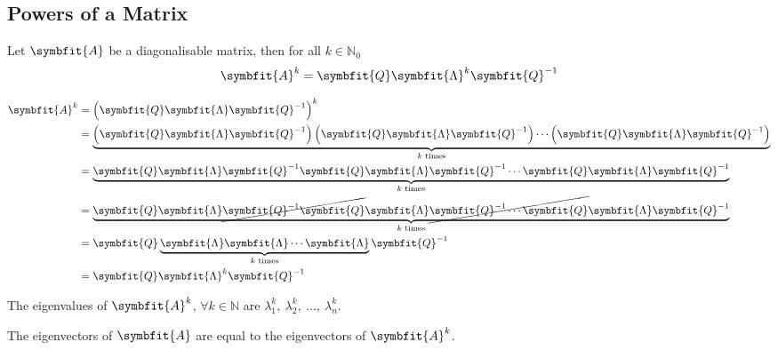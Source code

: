 \documentclass{article}
\begin{document}
\subsection{Powers of a Matrix}
\begin{theorem}
    Let \(\symbfit{A}\) be a diagonalisable matrix, then for all
    \(k \in \mathbb{N}_0\)
    \begin{equation*}
        \symbfit{A}^k = \symbfit{Q} \symbfit{\Lambda}^k \symbfit{Q}^{-1}
    \end{equation*}
\end{theorem}
\begin{solutionF}[Proof]
    \begin{align*}
        \symbfit{A}^k & = \left( \symbfit{Q} \symbfit{\Lambda} \symbfit{Q}^{-1} \right)^k                                                                                                                                                                 \\
                      & = \underbrace{\left( \symbfit{Q} \symbfit{\Lambda} \symbfit{Q}^{-1} \right)\left( \symbfit{Q} \symbfit{\Lambda} \symbfit{Q}^{-1} \right)\cdots\left( \symbfit{Q} \symbfit{\Lambda} \symbfit{Q}^{-1} \right)}_{\text{\(k\) times}} \\
                      & = \underbrace{\symbfit{Q} \symbfit{\Lambda} \symbfit{Q}^{-1} \symbfit{Q} \symbfit{\Lambda} \symbfit{Q}^{-1} \cdots \symbfit{Q} \symbfit{\Lambda} \symbfit{Q}^{-1} }_{\text{\(k\) times}}                                          \\
                      & = \underbrace{\symbfit{Q} \symbfit{\Lambda} \cancel{\symbfit{Q}^{-1} \symbfit{Q}} \symbfit{\Lambda} \cancel{\symbfit{Q}^{-1} \cdots \symbfit{Q}} \symbfit{\Lambda} \symbfit{Q}^{-1} }_{\text{\(k\) times}}                        \\
                      & = \symbfit{Q} \underbrace{ \symbfit{\Lambda} \symbfit{\Lambda} \cdots \symbfit{\Lambda} }_{\text{\(k\) times}}\symbfit{Q}^{-1}                                                                                                    \\
                      & = \symbfit{Q} \symbfit{\Lambda}^k\symbfit{Q}^{-1}
    \end{align*}
\end{solutionF}
\begin{theorem}
    The eigenvalues of \(\symbfit{A}^k\), \(\forall k \in \mathbb{N}\)
    are \(\lambda_1^k,\: \lambda_2^k,\: \dots,\: \lambda_n^k\).
\end{theorem}
\begin{theorem}
    The eigenvectors of \(\symbfit{A}\) are equal to the eigenvectors of
    \(\symbfit{A}^k\).
\end{theorem}
\newpage
\end{document}
